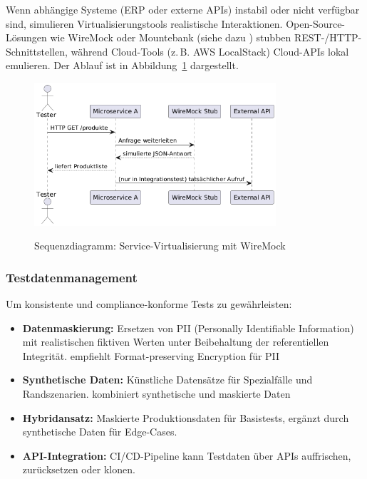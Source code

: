 Wenn abhängige Systeme (ERP oder externe APIs) instabil oder nicht verfügbar sind, simulieren
Virtualisierungstools realistische Interaktionen. Open-Source-Lösungen wie WireMock oder Mountebank
(siehe dazu \citet{byars2018}) stubben REST-/HTTP-Schnittstellen, während Cloud-Tools
(z.\,B. AWS LocalStack) Cloud-APIs lokal emulieren. Der Ablauf ist in Abbildung~\ref{fig:sequence}
dargestellt.\begin{figure}[h!]

\centering
\caption{Sequenzdiagramm: Service-Virtualisierung mit WireMock}
    \includegraphics[width=0.8\textwidth]{fig/servicevirti.png}
    \label{fig:sequence}
\end{figure}

\newpage

\subsubsection{Testdatenmanagement}
Um konsistente und compliance-konforme Tests zu gewährleisten:
\begin{itemize}
    \item \textbf{Datenmaskierung:} Ersetzen von PII (Personally Identifiable Information) mit 
    realistischen fiktiven Werten unter Beibehaltung der referentiellen 
    Integrität.\citet{tricentis2024} empfiehlt Format-preserving Encryption für PII
    \item \textbf{Synthetische Daten:} Künstliche Datensätze für Spezialfälle und Randszenarien.
    \citet{browserstack2025} kombiniert synthetische und maskierte Daten
    \item \textbf{Hybridansatz:} Maskierte Produktionsdaten für Basistests, ergänzt durch
    synthetische Daten für Edge-Cases.
    \item \textbf{API-Integration:} CI/CD-Pipeline kann Testdaten über APIs auffrischen,
    zurücksetzen oder klonen.
\end{itemize}

